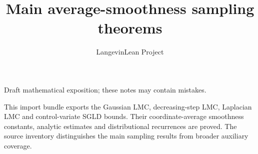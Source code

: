 \documentclass[11pt,a4paper]{article}
\title{\texorpdfstring{Main average-smoothness sampling theorems}{Main average-smoothness sampling theorems}}
\author{LangevinLean Project}
\date{}
\begin{document}
\maketitle
Draft mathematical exposition; these notes may contain mistakes.


This import bundle exports the Gaussian LMC, decreasing-step LMC, Laplacian LMC and control-variate SGLD bounds. Their coordinate-average smoothness constants, analytic estimates and distributional recurrences are proved. The source inventory distinguishes the main sampling results from broader auxiliary coverage.
\end{document}
